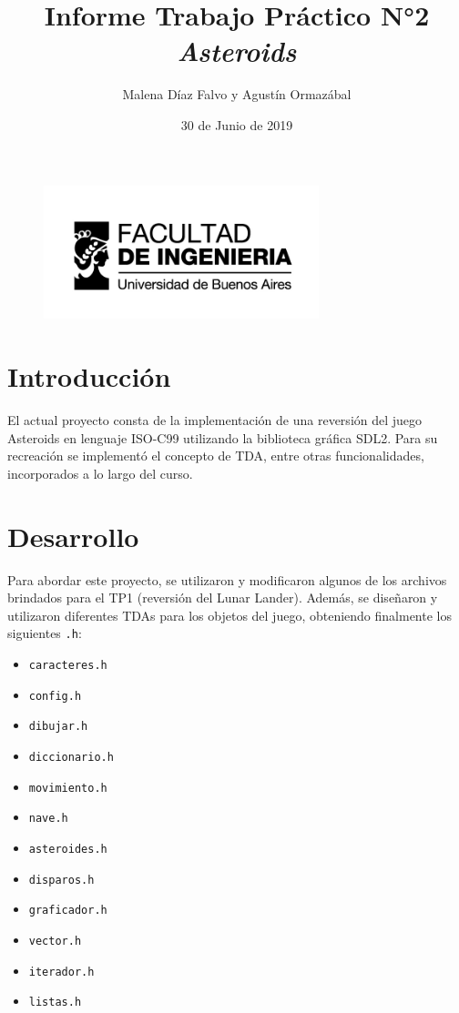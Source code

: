 \documentclass[a4paper, 12pt, spanish]{article}
\title{Informe Trabajo Práctico N°2 \linebreak \textit{Asteroids} \linebreak}
\author{Malena Díaz Falvo y Agustín Ormazábal}
\date{30 de Junio de 2019}
\begin{document}
\begin{figure}[t]
	\includegraphics[width=8cm]{logoFIUBA} 
\end{figure}
\maketitle

\thispagestyle{empty}
\newpage

\setcounter{page}{2}
\pagestyle{plain}

\section*{Introducción}
El actual proyecto consta de la implementación de una reversión del juego
Asteroids en lenguaje ISO-C99 utilizando la biblioteca gráfica SDL2. Para su recreación
se implementó el concepto de TDA, entre otras funcionalidades, incorporados a lo largo
del curso. \newline
 
\section*{Desarrollo}
Para abordar este proyecto, se utilizaron y modificaron algunos de los archivos brindados para el TP1 (reversión del Lunar 
Lander). Además, se diseñaron y utilizaron diferentes TDAs para los objetos del juego, obteniendo finalmente los siguientes \texttt{.h}:

\begin{multicols}{2}
\begin{itemize}[label=$\bullet$]

	\item \texttt{caracteres.h}
	\item \texttt{config.h} 
	\item \texttt{dibujar.h}
	\item \texttt{diccionario.h}
	\item \texttt{movimiento.h}
	\item \texttt{nave.h}
	\item \texttt{asteroides.h}
	\item \texttt{disparos.h}
	\item \texttt{graficador.h}
	\item \texttt{vector.h}
	\item \texttt{iterador.h}
	\item \texttt{listas.h}
	

\end{itemize}
\end{multicols}
\medskip
\end{document}
